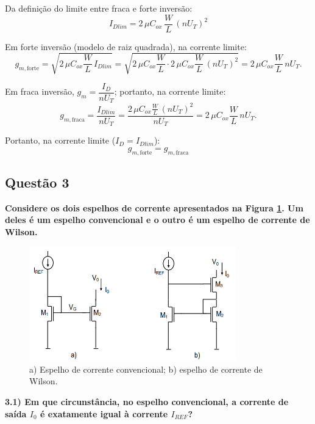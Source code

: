 \documentclass[12pt,a4paper]{article}
\begin{document}
Da definição do limite entre fraca e forte inversão:
\begin{equation}
I_{Dlim} = 2\,\mu C_{ox}\,\frac{W}{L}\,(nU_T)^2
\end{equation}

Em forte inversão (modelo de raiz quadrada), na corrente limite:
\begin{equation*}
g_{m,\text{forte}}=\sqrt{2\,\mu C_{ox}\frac{W}{L}\,I_{Dlim}}
=\sqrt{2\,\mu C_{ox}\frac{W}{L}\cdot 2\,\mu C_{ox}\frac{W}{L}\,(nU_T)^2}
=2\,\mu C_{ox}\frac{W}{L}\,nU_T.
\end{equation*}

Em fraca inversão, $g_m=\dfrac{I_D}{nU_T}$; portanto, na corrente limite:
\begin{equation*}
g_{m,\text{fraca}}=\frac{I_{Dlim}}{nU_T}
=\frac{2\,\mu C_{ox}\frac{W}{L}\,(nU_T)^2}{nU_T}
=2\,\mu C_{ox}\frac{W}{L}\,nU_T.
\end{equation*}

Portanto, na corrente limite ($I_D=I_{Dlim}$):
\begin{equation}
\boxed{g_{m,\text{forte}} = g_{m,\text{fraca}}}
\end{equation}

\subsection*{Questão 3}
\begin{BoxQ}
    \textbf{Considere os dois espelhos de corrente apresentados na Figura \ref{fig:espelhos_corrente}. Um deles é um espelho convencional e o outro é um espelho de corrente de Wilson.}
\end{BoxQ}\par

\begin{figure}[H]
    \centering
    \includegraphics[width=0.8\textwidth]{espelho_a_b.png}
    \caption{a) Espelho de corrente convencional; b) espelho de corrente de Wilson.}
    \label{fig:espelhos_corrente}
\end{figure}
\textbf{3.1) Em que circunstância, no espelho convencional, a corrente de saída $I_0$ é exatamente igual à corrente $I_{REF}$?}
\end{document}
